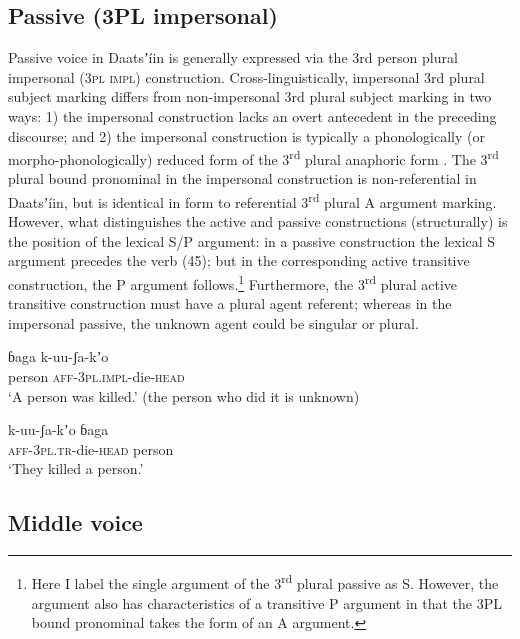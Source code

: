 \documentclass[output=paper]{langsci/langscibook}
\begin{document}
\subsection{Passive (3PL impersonal)}\label{sec:ahlandc:6.1}

Passive voice in Daatsʼ\'{i}in is generally expressed via the 3rd person plural impersonal (\textsc{3pl impl}) construction. Cross-linguistically, impersonal 3rd plural subject marking differs from non-impersonal 3rd plural subject marking in two ways: 1) the impersonal construction lacks an overt antecedent in the preceding discourse; and 2) the impersonal construction is typically a phonologically (or morpho-phonologically) reduced form of the 3\textsuperscript{rd} plural anaphoric form \citep[75]{Sieiwerska2010}. The 3\textsuperscript{rd} plural bound pronominal in the impersonal construction is non-referential in Daatsʼ\'{i}in, but is identical in form to referential 3\textsuperscript{rd} plural A argument marking. However, what distinguishes the active and passive constructions (structurally) is the position of the lexical S/P argument: in a passive construction the lexical S argument precedes the verb (45); but in the corresponding active transitive construction, the P argument follows.\footnote{Here I label the single argument of the 3\textsuperscript{rd} plural passive as S. However, the argument also has characteristics of a transitive P argument in that the 3PL bound pronominal takes the form of an A argument. } Furthermore, the 3\textsuperscript{rd} plural active transitive construction must have a plural agent referent; whereas in the impersonal passive, the unknown agent could be singular or plural.

\ea\label{ex:ahlandc:45}
\gll
ɓaga     k-uu-ʃa-kʼo   \\
person   \textsc{aff}\textsc{{}-3pl.impl-}die\textsc{{}-head} \\
\glt
‘A person was killed.’ (the person who did it is unknown)
\z

\ea\label{ex:ahlandc:46}
\gll
k-uu-ʃa-kʼo     ɓaga  \\
\textsc{aff}\textsc{{}-3pl.tr-}die\textsc{{}-head   } person \\
\glt
‘They killed a person.’
\z

\subsection{Middle voice}\label{sec:ahlandc:6.2}
\end{document}
